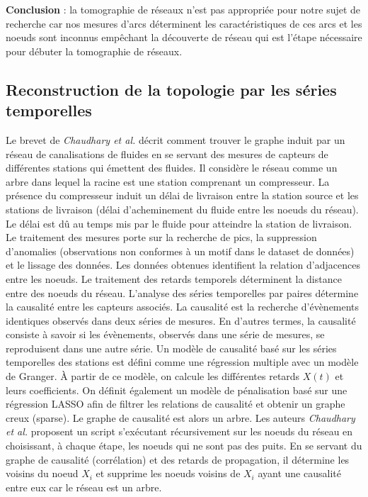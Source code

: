{\bf Conclusion} :
la tomographie de r\'eseaux n'est pas appropri\'ee pour notre sujet de recherche car nos mesures d'arcs d\'eterminent les caract\'eristiques de ces arcs et les noeuds sont inconnus emp\^echant la d\'ecouverte de r\'eseau qui est l'\'etape n\'ecessaire pour d\'ebuter la tomographie de r\'eseaux.


\subsection{Reconstruction de la topologie par les s\'eries temporelles}
Le brevet de {\em Chaudhary et al.} \cite{chaudhary2016network} d\'ecrit comment trouver le graphe induit par un r\'eseau de canalisations de fluides en se servant des mesures de capteurs de diff\'erentes stations qui \'emettent des fluides. Il consid\`ere le r\'eseau comme un arbre dans lequel la racine est une station comprenant un compresseur. La pr\'esence du compresseur induit un d\'elai de livraison entre la station source et les stations de livraison (d\'elai d'acheminement du fluide entre les noeuds du r\'eseau). 
Le d\'elai est d\^u au temps mis par le fluide pour atteindre la station de livraison. 
\newline
Le traitement des mesures \cite{cincotta1995astronomical, hurley2011methods, mohanty2000robust} porte sur la recherche de pics, la suppression d'anomalies (observations non conformes \`a un motif dans le dataset de donn\'ees) et le lissage des donn\'ees. 
Les donn\'ees obtenues identifient la relation d'adjacences entre les noeuds.
Le traitement des retards temporels d\'eterminent la distance entre des noeuds du r\'eseau.
L'analyse des s\'eries temporelles par paires d\'etermine la causalit\'e entre les capteurs associ\'es. 
La causalit\'e est la recherche d'\'ev\`enements identiques observ\'es dans deux s\'eries de mesures.
En d'autres termes, la causalit\'e consiste \`a savoir si les \'ev\`enements, observ\'es dans une s\'erie de mesures, se reproduisent dans une autre s\'erie. 
Un mod\`ele de causalit\'e bas\'e sur les s\'eries temporelles des stations est d\'efini comme une r\'egression multiple avec un mod\`ele de Granger.
\`A partir de ce mod\`ele, on calcule les diff\'erentes retards $X(t)$ et leurs coefficients.
On d\'efinit \'egalement un mod\`ele de p\'enalisation bas\'e sur une r\'egression LASSO afin de filtrer les relations de causalit\'e et obtenir un graphe creux (sparse). 
Le graphe de causalit\'e est alors un arbre.
\newline
Les auteurs {\em Chaudhary et al.}  proposent un script s'ex\'ecutant r\'ecursivement sur les noeuds du r\'eseau en choisissant, \`a chaque \'etape, les noeuds qui ne sont pas des puits. En se servant du graphe de causalit\'e (corr\'elation) et des retards de propagation, il d\'etermine les voisins du noeud $X_i$ et supprime les noeuds voisins de $X_i$  ayant une causalit\'e entre eux car le r\'eseau est un arbre.
